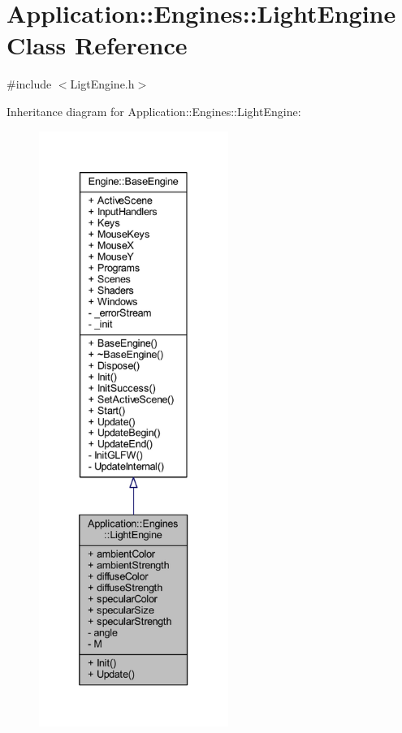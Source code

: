 \hypertarget{classApplication_1_1Engines_1_1LightEngine}{}\section{Application\+:\+:Engines\+:\+:Light\+Engine Class Reference}
\label{classApplication_1_1Engines_1_1LightEngine}


{\ttfamily \#include $<$Ligt\+Engine.\+h$>$}



Inheritance diagram for Application\+:\+:Engines\+:\+:Light\+Engine\+:
\nopagebreak
\begin{figure}[H]
\begin{center}
\leavevmode
\includegraphics[height=550pt]{classApplication_1_1Engines_1_1LightEngine__inherit__graph}
\end{center}
\end{figure}


